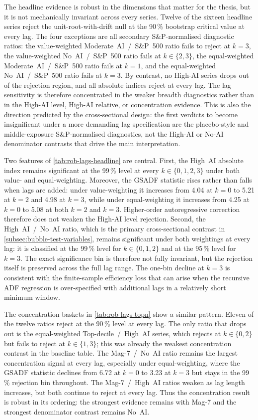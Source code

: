 The headline evidence is robust in the dimensions that matter for the thesis, but it is not mechanically invariant across every series. Twelve of the sixteen headline series reject the unit-root-with-drift null at the 90\,\% bootstrap critical value at every lag. The four exceptions are all secondary S\&P-normalised diagnostic ratios: the value-weighted Moderate~AI~/~S\&P~500 ratio fails to reject at $k=3$, the value-weighted No~AI~/~S\&P~500 ratio fails at $k\in\{2,3\}$, the equal-weighted Moderate~AI~/~S\&P~500 ratio fails at $k=1$, and the equal-weighted No~AI~/~S\&P~500 ratio fails at $k=3$. By contrast, no High-AI series drops out of the rejection region, and all absolute indices reject at every lag. The lag sensitivity is therefore concentrated in the weaker breadth diagnostics rather than in the High-AI level, High-AI relative, or concentration evidence. This is also the direction predicted by the cross-sectional design: the first verdicts to become insignificant under a more demanding lag specification are the placebo-style and middle-exposure S\&P-normalised diagnostics, not the High-AI or No-AI denominator contrasts that drive the main interpretation.

Two features of \cref{tab:rob-lags-headline} are central. First, the High~AI absolute index remains significant at the 99\,\% level at every $k\in\{0,1,2,3\}$ under both value- and equal-weighting. Moreover, the GSADF statistic rises rather than falls when lags are added: under value-weighting it increases from 4.04 at $k=0$ to 5.21 at $k=2$ and 4.98 at $k=3$, while under equal-weighting it increases from 4.25 at $k=0$ to 5.08 at both $k=2$ and $k=3$. Higher-order autoregressive correction therefore does not weaken the High-AI level rejection. Second, the High~AI~/~No~AI ratio, which is the primary cross-sectional contrast in \cref{subsec:bubble-test-variables}, remains significant under both weightings at every lag: it is classified at the 99\,\% level for $k\in\{0,1,2\}$ and at the 95\,\% level for $k=3$. The exact significance bin is therefore not fully invariant, but the rejection itself is preserved across the full lag range. The one-bin decline at $k=3$ is consistent with the finite-sample efficiency loss that can arise when the recursive ADF regression is over-specified with additional lags in a relatively short minimum window.

The concentration baskets in \cref{tab:rob-lags-topn} show a similar pattern. Eleven of the twelve ratios reject at the 90\,\% level at every lag. The only ratio that drops out is the equal-weighted Top-decile~/~High~AI series, which rejects at $k\in\{0,2\}$ but fails to reject at $k\in\{1,3\}$; this was already the weakest concentration contrast in the baseline table. The Mag-7~/~No~AI ratio remains the largest concentration signal at every lag, especially under equal-weighting, where the GSADF statistic declines from 6.72 at $k=0$ to 3.23 at $k=3$ but stays in the 99\,\% rejection bin throughout. The Mag-7~/~High~AI ratios weaken as lag length increases, but both continue to reject at every lag. Thus the concentration result is robust in its ordering: the strongest evidence remains with Mag-7 and the strongest denominator contrast remains No~AI.

